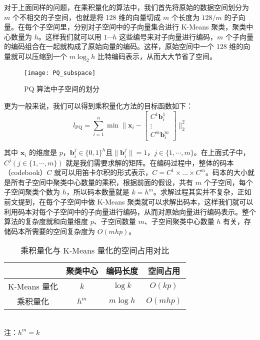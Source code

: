 对于上面同样的问题，在乘积量化的算法中，我们首先将原始的数据空间划分为 $m$ 个不相交的子空间，也就是将 128 维的向量切成 $m$ 个长度为 $128/m$ 的子向量。在每个子空间里，分别对子空间中的子向量集合进行 K-Means 聚类，聚类中心数量为 $h$。这样我们就可以用 $1\cdots h$ 这些编号来对子向量进行编码，$m$ 个子向量的编码组合在一起就构成了原始向量的编码。这样，原始空间中一个 128 维的向量就可以压缩到一个 $m\log_2h$ 比特编码表示，从而大大节省了空间。
\begin{figure}[H]
  \centering
  \texttt{[image: PQ\_subspace]}
  \caption{PQ 算法中子空间的划分}
  \label{fig:PQ_subspace}
\end{figure}
更为一般来说，我们可以得到乘积量化方法的目标函数如下：
\begin{equation}
\mathit{l}_\mathrm{PQ} = \sum_{i=1}^n\min\Bigg\lVert \mathbf{x}_i - \begin{bmatrix}C^1\mathbf{b}^1_i\\\vdots\\C^m\mathbf{b}^m_i\end{bmatrix} \Bigg\rVert _2^2
\end{equation}

其中 $\mathbf{x}_i$ 的维度是 $p$，$\mathbf{b}^j_i \in \{0,1\}^h$且$\lVert\mathbf{b}^j_i\rVert=1$，$j \in \{1,\cdots,m\}$。在上面式子中，$C^j(j\in \{1,\cdots,m\})$ 就是我们需要求解的矩阵。在编码过程中，整体的码本（codebook）$C$ 就可以用笛卡尔积的形式表示，$C = C^1 \times \ldots \times C^m$。码本的大小就是所有子空间中聚类中心数量的乘积，根据前面的假设，共有 $m$ 个子空间，每个子空间聚类个数为 $h$，所以码本数量就是 $k = h^m$。求解过程其实并不复杂，正如前文提到，在每个子空间中做 K-Means 聚类就可以求解出码本，这样我们就可以利用码本对每个子空间中的子向量进行编码，从而对原始向量进行编码表示。整个算法的复杂度就和向量维度 $p$、子空间数量 $m$、子空间聚类中心数量 $h$ 有关，存储码本所需要的空间复杂度为 $O(mhp)$。
\begin{table}[htbp]
  \centering
  \caption{乘积量化与 K-Means 量化的空间占用对比}
  \label{tab:kmean_pq}
  \begin{minipage}[t]{0.61\textwidth}
    \begin{tabular}{|c|c|c|c|}
      \hline
                    & 聚类中心 & 编码长度& 空间占用\\
      \hline
      K-Means 量化  &  $k$ &   $\log k$&   $O(kp)$\\
      乘积量化      &   $h^m$ &   $m\log h$ &  $O(mhp)$\\
      \hline
    \end{tabular}\\[2pt]
    \footnotesize 注：$h^m = k$
  \end{minipage}
\end{table}

